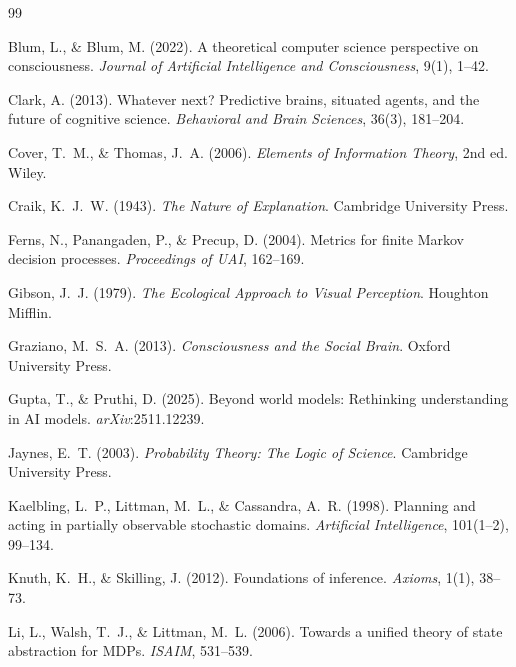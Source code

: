 \documentclass[11pt,a4paper]{article}
\begin{document}
\begin{thebibliography}{99}

Blum, L., \& Blum, M. (2022).
A theoretical computer science perspective on consciousness.
\textit{Journal of Artificial Intelligence and Consciousness}, 9(1), 1--42.

Clark, A. (2013).
Whatever next? Predictive brains, situated agents, and the future of cognitive
science.
\textit{Behavioral and Brain Sciences}, 36(3), 181--204.

Cover, T.~M., \& Thomas, J.~A. (2006).
\textit{Elements of Information Theory}, 2nd ed.
Wiley.

Craik, K.~J.~W. (1943).
\textit{The Nature of Explanation}.
Cambridge University Press.

Ferns, N., Panangaden, P., \& Precup, D. (2004).
Metrics for finite Markov decision processes.
\textit{Proceedings of UAI}, 162--169.

Gibson, J.~J. (1979).
\textit{The Ecological Approach to Visual Perception}.
Houghton Mifflin.

Graziano, M.~S.~A. (2013).
\textit{Consciousness and the Social Brain}.
Oxford University Press.

Gupta, T., \& Pruthi, D. (2025).
Beyond world models: Rethinking understanding in AI models.
\textit{arXiv}:2511.12239.

Jaynes, E.~T. (2003).
\textit{Probability Theory: The Logic of Science}.
Cambridge University Press.

Kaelbling, L.~P., Littman, M.~L., \& Cassandra, A.~R. (1998).
Planning and acting in partially observable stochastic domains.
\textit{Artificial Intelligence}, 101(1--2), 99--134.

Knuth, K.~H., \& Skilling, J. (2012).
Foundations of inference.
\textit{Axioms}, 1(1), 38--73.

Li, L., Walsh, T.~J., \& Littman, M.~L. (2006).
Towards a unified theory of state abstraction for MDPs.
\textit{ISAIM}, 531--539.


\end{thebibliography}
\end{document}
